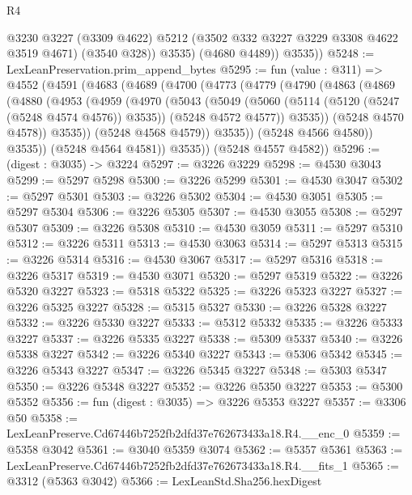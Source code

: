 \begin{lexlean}{R4}
\begin{coremodule}
              @3230
              @3227
              (@3309 @4622)
              @5212
              (@3502 @332 @3227 @3229 @3308 @4622 @3519 @4671)
              (@3540 @328))
            @3535)
          (@4680 @4489))
        @3535))
@5248 := LexLeanPreservation.prim_append_bytes
@5295 := fun (value : @311) =>
  @4552
    (@4591
      (@4683
        (@4689
          (@4700
            (@4773
              (@4779
                (@4790
                  (@4863
                    (@4869
                      (@4880
                        (@4953
                          (@4959
                            (@4970
                              (@5043
                                (@5049
                                  (@5060
                                    (@5114 (@5120 (@5247 (@5248 @4574 @4576)) @3535))
                                    (@5248 @4572 @4577))
                                  @3535))
                              (@5248 @4570 @4578))
                            @3535))
                        (@5248 @4568 @4579))
                      @3535))
                  (@5248 @4566 @4580))
                @3535))
            (@5248 @4564 @4581))
          @3535))
      (@5248 @4557 @4582))
@5296 := (digest : @3035) -> @3224
@5297 := @3226 @3229
@5298 := @4530 @3043
@5299 := @5297 @5298
@5300 := @3226 @5299
@5301 := @4530 @3047
@5302 := @5297 @5301
@5303 := @3226 @5302
@5304 := @4530 @3051
@5305 := @5297 @5304
@5306 := @3226 @5305
@5307 := @4530 @3055
@5308 := @5297 @5307
@5309 := @3226 @5308
@5310 := @4530 @3059
@5311 := @5297 @5310
@5312 := @3226 @5311
@5313 := @4530 @3063
@5314 := @5297 @5313
@5315 := @3226 @5314
@5316 := @4530 @3067
@5317 := @5297 @5316
@5318 := @3226 @5317
@5319 := @4530 @3071
@5320 := @5297 @5319
@5322 := @3226 @5320 @3227
@5323 := @5318 @5322
@5325 := @3226 @5323 @3227
@5327 := @3226 @5325 @3227
@5328 := @5315 @5327
@5330 := @3226 @5328 @3227
@5332 := @3226 @5330 @3227
@5333 := @5312 @5332
@5335 := @3226 @5333 @3227
@5337 := @3226 @5335 @3227
@5338 := @5309 @5337
@5340 := @3226 @5338 @3227
@5342 := @3226 @5340 @3227
@5343 := @5306 @5342
@5345 := @3226 @5343 @3227
@5347 := @3226 @5345 @3227
@5348 := @5303 @5347
@5350 := @3226 @5348 @3227
@5352 := @3226 @5350 @3227
@5353 := @5300 @5352
@5356 := fun (digest : @3035) => @3226 @5353 @3227
@5357 := @3306 @50
@5358 := LexLeanPreserve.Cd67446b7252fb2dfd37e762673433a18.R4.__enc_0
@5359 := @5358 @3042
@5361 := @3040 @5359 @3074
@5362 := @5357 @5361
@5363 := LexLeanPreserve.Cd67446b7252fb2dfd37e762673433a18.R4.__fits_1
@5365 := @3312 (@5363 @3042)
@5366 := LexLeanStd.Sha256.hexDigest

\end{coremodule}
\end{lexlean}
